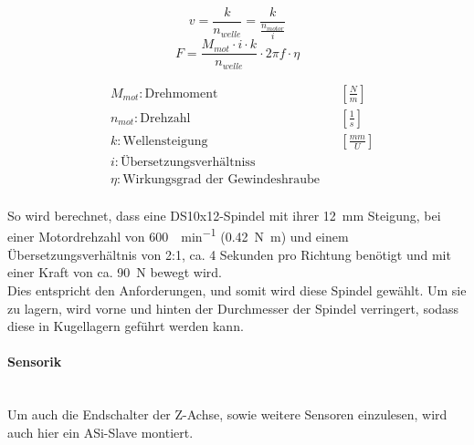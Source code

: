 \vspace{5mm}
\noindent\begin{minipage}{\textwidth}
\begin{minipage}[t]{0.5\textwidth}
    \vspace{10mm}
    \begin{equation*}
        v = \frac{k}{n_{welle}} = \frac{k}{\frac{n_{motor}}{i}}
    \end{equation*}
    \begin{equation*}
        F = \frac{M_{mot} \cdot i \cdot k}{n_{welle}} \cdot 2 \pi f \cdot \eta 
    \end{equation*}
\end{minipage}%
\begin{minipage}[t]{0.5\textwidth}
    \vspace{-7mm}
    \begin{align*}
        &M_{mot}: \text{Drehmoment} & &\left[\frac{N}{m}\right]\\
        &n_{mot}: \text{Drehzahl} & &\left[\frac{1}{s}\right]\\
        &k: \text{Wellensteigung} & &\left[\frac{mm}{U}\right]\\
        &i: \text{Übersetzungsverhältniss} & \\
        &\eta: \text{Wirkungsgrad der Gewindeshraube} & \\
    \end{align*}
\end{minipage}
\end{minipage}

\vspace{5mm}

So wird berechnet, dass eine DS10x12-Spindel mit ihrer \SI{12}{\mm} Steigung, bei einer Motordrehzahl von {\SI{600}{\Umdrehung\per\minute}} (\SI{0.42}{\newton\meter}) und einem Übersetzungsverhältnis von 2:1, ca. 4 Sekunden pro Richtung benötigt und mit einer Kraft von ca. \SI{90}{\newton} bewegt wird.\\
Dies entspricht den Anforderungen, und somit wird diese Spindel gewählt. Um sie zu lagern, wird vorne und hinten der Durchmesser der Spindel verringert, sodass diese in Kugellagern geführt werden kann.

\paragraph{Sensorik}\mbox{}\\
Um auch die Endschalter der Z-Achse, sowie weitere Sensoren einzulesen, wird auch hier ein ASi-Slave montiert.



